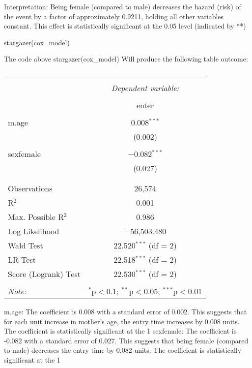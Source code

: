 \documentclass[12pt,letterpaper]{article}
\begin{document}
	Interpretation: Being female (compared to male) decreases the hazard (risk) of the event by a factor of approximately 0.9211, holding all other variables constant. This effect is statistically significant at the 0.05 level (indicated by **)
\newpage

stargazer(cox_model)

The code above stargazer(cox_model)
Will produce the following table outcome:

\begin{table}[!htbp] \centering 
	\caption{} 
	\label{} 
	\begin{tabular}{@{\extracolsep{5pt}}lc} 
		\\[-1.8ex]\hline 
		\hline \\[-1.8ex] 
		& \multicolumn{1}{c}{\textit{Dependent variable:}} \\ 
		\cline{2-2} 
		\\[-1.8ex] & enter \\ 
		\hline \\[-1.8ex] 
		m.age & 0.008$^{***}$ \\ 
		& (0.002) \\ 
		& \\ 
		sexfemale & $-$0.082$^{***}$ \\ 
		& (0.027) \\ 
		& \\ 
		\hline \\[-1.8ex] 
		Observations & 26,574 \\ 
		R$^{2}$ & 0.001 \\ 
		Max. Possible R$^{2}$ & 0.986 \\ 
		Log Likelihood & $-$56,503.480 \\ 
		Wald Test & 22.520$^{***}$ (df = 2) \\ 
		LR Test & 22.518$^{***}$ (df = 2) \\ 
		Score (Logrank) Test & 22.530$^{***}$ (df = 2) \\ 
		\hline 
		\hline \\[-1.8ex] 
		\textit{Note:}  & \multicolumn{1}{r}{$^{*}$p$<$0.1; $^{**}$p$<$0.05; $^{***}$p$<$0.01} \\ 
	\end{tabular} 
\end{table} 

m.age: The coefficient is 0.008 with a standard error of 0.002. This suggests that for each unit increase in mother's age, the entry time increases by 0.008 units. The coefficient is statistically significant at the 1%
sexfemale: The coefficient is -0.082 with a standard error of 0.027. This suggests that being female (compared to male) decreases the entry time by 0.082 units. The coefficient is statistically significant at the 1%



\vspace{0.5cm}
\end{document}
